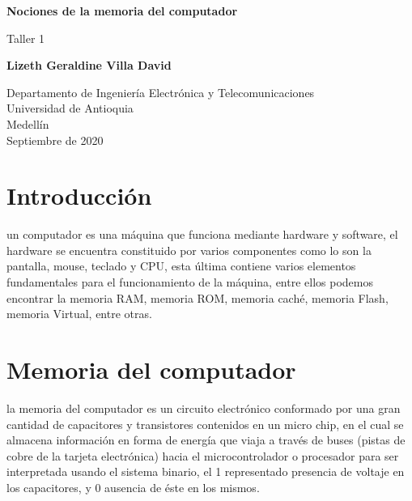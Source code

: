 \documentclass{article}
\begin{document}
\begin{titlepage}
    \begin{center}
        \vspace*{1cm}
            
        \Huge
        \textbf{Nociones de la memoria del computador}
            
        \vspace{0.5cm}
        \LARGE
        Taller 1
            
        \vspace{1.5cm}
            
        \textbf{Lizeth Geraldine Villa David}
            
        \vfill
            
        \vspace{0.8cm}
            
        \Large
        Departamento de Ingeniería Electrónica y Telecomunicaciones\\
        Universidad de Antioquia\\
        Medellín\\
        Septiembre de 2020
            
    \end{center}
\end{titlepage}

\tableofcontents

\section{Introducción}\label{contenido}

un computador es una máquina que funciona mediante hardware y software, 
el hardware se encuentra constituido por varios componentes
como lo son la pantalla, mouse, teclado y CPU, esta última contiene varios 
elementos fundamentales para el funcionamiento de la máquina, 
entre ellos podemos encontrar la memoria RAM, memoria ROM, memoria  caché, 
memoria Flash, memoria Virtual, entre otras. 

\section{Memoria del computador}\label{contenido}

la memoria del computador es un circuito electrónico conformado por una gran cantidad de 
capacitores y transistores contenidos en un micro chip, en el cual se almacena información en forma de energía que viaja a través de buses (pistas de cobre de la tarjeta electrónica) hacia el microcontrolador o procesador para ser interpretada usando el sistema binario, el 1 representado presencia de voltaje en los capacitores, y 0  ausencia de éste en los mismos.
\end{document}
